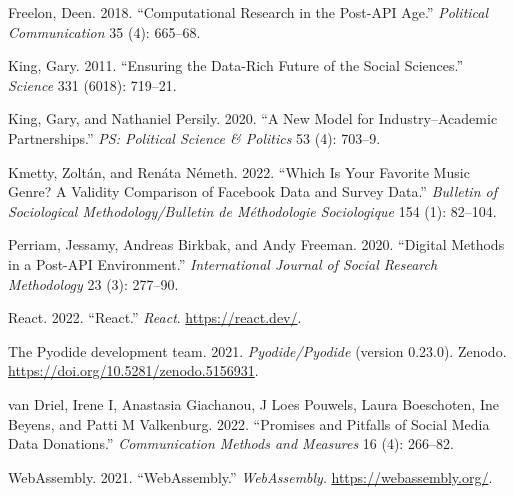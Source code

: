 \documentclass[
]{article}
\newlength{\cslhangindent}
\newlength{\cslentryspacingunit} %
\newenvironment{CSLReferences}[2] %
 {%
  \setlength{\parindent}{0pt}
  \ifodd #1
  \let\oldpar\par
  \def\par{\hangindent=\cslhangindent\oldpar}
  \fi
  \setlength{\parskip}{#2\cslentryspacingunit}
 }%
 {}
\begin{document}
\begin{CSLReferences}{1}{0}
\leavevmode{}%
Freelon, Deen. 2018. {``Computational Research in the Post-API Age.''}
\emph{Political Communication} 35 (4): 665--68.

\leavevmode{}%
King, Gary. 2011. {``Ensuring the Data-Rich Future of the Social
Sciences.''} \emph{Science} 331 (6018): 719--21.

\leavevmode{}%
King, Gary, and Nathaniel Persily. 2020. {``A New Model for
Industry--Academic Partnerships.''} \emph{PS: Political Science \&
Politics} 53 (4): 703--9.

\leavevmode{}%
Kmetty, Zoltán, and Renáta Németh. 2022. {``Which Is Your Favorite Music
Genre? A Validity Comparison of Facebook Data and Survey Data.''}
\emph{Bulletin of Sociological Methodology/Bulletin de M{é}thodologie
Sociologique} 154 (1): 82--104.

\leavevmode{}%
Perriam, Jessamy, Andreas Birkbak, and Andy Freeman. 2020. {``Digital
Methods in a Post-API Environment.''} \emph{International Journal of
Social Research Methodology} 23 (3): 277--90.

\leavevmode{}%
React. 2022. {``React.''} \emph{React}. \url{https://react.dev/}.

\leavevmode{}%
The Pyodide development team. 2021. \emph{Pyodide/Pyodide} (version
0.23.0). Zenodo. \url{https://doi.org/10.5281/zenodo.5156931}.

\leavevmode{}%
van Driel, Irene I, Anastasia Giachanou, J Loes Pouwels, Laura
Boeschoten, Ine Beyens, and Patti M Valkenburg. 2022. {``Promises and
Pitfalls of Social Media Data Donations.''} \emph{Communication Methods
and Measures} 16 (4): 266--82.

\leavevmode{}%
WebAssembly. 2021. {``WebAssembly.''} \emph{WebAssembly}.
\url{https://webassembly.org/}.

\end{CSLReferences}
\end{document}
